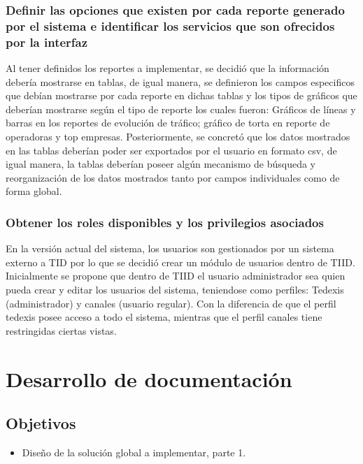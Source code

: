 \subsubsection{Definir las opciones que existen por cada reporte generado por el sistema e identificar los servicios que son ofrecidos por la interfaz}

\indent Al tener definidos los reportes a implementar, se decidió que la información debería mostrarse en tablas, de igual manera, se definieron los campos especificos que debían mostrarse por cada reporte en dichas tablas y los tipos de gráficos que deberían mostrarse según el tipo de reporte los cuales fueron: Gráficos de líneas y barras en los reportes de evolución de tráfico; gráfico de torta en reporte de operadoras y top empresas.
\newline
\newline
\indent Posteriormente, se concretó que los datos mostrados en las tablas deberían poder ser exportados por el usuario en formato csv, de igual manera, la tablas deberían poseer algún mecanismo de búsqueda y reorganización de los datos mostrados tanto por campos individuales como de forma global.

\subsubsection{Obtener los roles disponibles y los privilegios asociados}

\indent En la versión actual del sistema, los usuarios son gestionados por un sistema externo a TID por lo que se decidió crear un módulo de usuarios dentro de TIID. Inicialmente se propone que dentro de TIID el usuario administrador sea quien pueda crear y editar los usuarios del sistema, teniendose como perfiles: Tedexis (administrador) y canales (usuario regular). Con la diferencia de que el perfil tedexis posee acceso a todo el sistema, mientras que el perfil canales tiene restringidas ciertas vistas.


\section{Desarrollo de documentación} \label{sect:Desarrollo de documentacin}

\subsection{Objetivos}
\begin{itemize}[noitemsep,nolistsep]
\item Diseño de la solución global a implementar, parte 1. 
\end{itemize}


